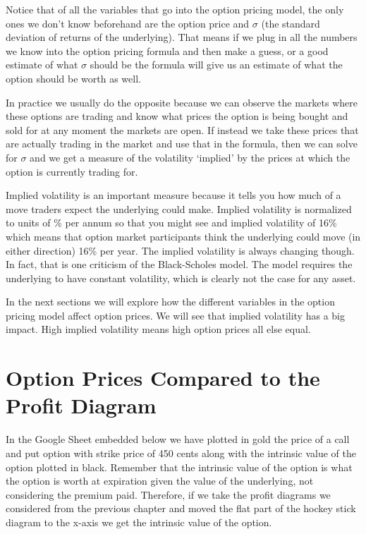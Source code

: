 \documentclass[
]{book}
\begin{document}
Notice that of all the variables that go into the option pricing model, the only ones we don't know beforehand are the option price and \(\sigma\) (the standard deviation of returns of the underlying). That means if we plug in all the numbers we know into the option pricing formula and then make a guess, or a good estimate of what \(\sigma\) should be the formula will give us an estimate of what the option should be worth as well.

In practice we usually do the opposite because we can observe the markets where these options are trading and know what prices the option is being bought and sold for at any moment the markets are open. If instead we take these prices that are actually trading in the market and use that in the formula, then we can solve for \(\sigma\) and we get a measure of the volatility `implied' by the prices at which the option is currently trading for.

Implied volatility is an important measure because it tells you how much of a move traders expect the underlying could make. Implied volatility is normalized to units of \% per annum so that you might see and implied volatility of 16\% which means that option market participants think the underlying could move (in either direction) 16\% per year\citep{ganti}. The implied volatility is always changing though. In fact, that is one criticism of the Black-Scholes model. The model requires the underlying to have constant volatility, which is clearly not the case for any asset.

In the next sections we will explore how the different variables in the option pricing model affect option prices. We will see that implied volatility has a big impact. High implied volatility means high option prices all else equal.

\hypertarget{option-prices-compared-to-the-profit-diagram}{%
\section{Option Prices Compared to the Profit Diagram}\label{option-prices-compared-to-the-profit-diagram}}

In the Google Sheet embedded below we have plotted in gold the price of a call and put option with strike price of 450 cents along with the intrinsic value of the option plotted in black. Remember that the intrinsic value of the option is what the option is worth at expiration given the value of the underlying, not considering the premium paid. Therefore, if we take the profit diagrams we considered from the previous chapter and moved the flat part of the hockey stick diagram to the x-axis we get the intrinsic value of the option.
\end{document}

